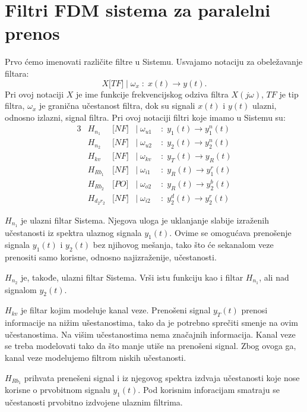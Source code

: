 \documentclass[titlepage,a4paper,12pt]{article}
\begin{document}
	\section{Filtri FDM sistema za paralelni prenos}
	Prvo ćemo imenovati različite filtre u Sistemu. Usvajamo notaciju za obeležavanje filtara:
	\begin{equation*}
		X\big[TF\big] \; \Big| \;\omega_x\;:\;x(t) \rightarrow y(t).
	\end{equation*}
	Pri ovoj notaciji $X$ je ime funkcije frekvencijskog odziva filtra $X(j\omega)$, $TF$ je tip filtra, $\omega_x$ je granična učestanost filtra, dok su signali $x(t)$ i $y(t)$ ulazni, odnosno izlazni, signal filtra. Pri ovoj notaciji filtri koje imamo u Sistemu su:
	\begin{alignat*}{3}
		&H_{n_1}&\big[NF\big] &\Big| \;\omega_{u1}\;&:\; y_1(t) \rightarrow y_1^n(t)\\
		&H_{n_2}&\big[NF\big] &\Big| \;\omega_{u2}\;&:\; y_2(t) \rightarrow y_2^n(t)\\
		&H_{kv}&\big[NF\big] &\Big| \;\omega_{kv}\;&:\; y_T(t) \rightarrow y_R(t)\\
		&H_{Rb_1}&\big[NF\big] &\Big| \;\omega_{i1}\;&:\; y_R(t) \rightarrow y_1^r(t)\\
		&H_{Rb_2}&\big[PO\big] &\Big| \;\omega_{o2}\;&:\; y_R(t) \rightarrow y_2^b(t)\\
		&H_{d_2r_2}&\big[NF\big] &\Big| \;\omega_{i2}\;&:\; y_2^d(t) \rightarrow y_2^r(t)
	\end{alignat*}

	$H_{n_1}$ je ulazni filtar Sistema. Njegova uloga je uklanjanje slabije izraženih učestanosti iz spektra ulaznog signala $y_1(t)$. Ovime se omogućava prenošenje signala $y_1(t)$ i $y_2(t)$ bez njihovog mešanja, tako što će sekanalom veze prenositi samo korisne, odnosno najizraženije, učestanosti.
	
	\smallskip
	$H_{n_2}$ je, takođe, ulazni filtar Sistema. Vrši istu funkciju kao i filtar $H_{n_1}$, ali nad signalom $y_2(t)$.
	
	\smallskip
	$H_{kv}$ je filtar kojim modeluje kanal veze. Prenošeni signal $y_T(t)$ prenosi informacije na nižim ušestanostima, tako da je potrebno sprečiti smenje na ovim učestanostima. Na višim učestanostima nema značajnih informacija. Kanal veze se treba modelovati tako da što manje utiše na prenošeni signal. Zbog ovoga ga, kanal veze modelujemo filtrom niskih učestanosti. 
	
	\smallskip
	$H_{Rb_1}$ prihvata prenešeni signal i iz njegovog spektra izdvaja učestanosti koje nose korisne o prvobitnom signalu $y_1(t)$. Pod korisnim inforacijam smatraju se učestanosti prvobitno izdvojene ulaznim filtrima.
	
\end{document}
